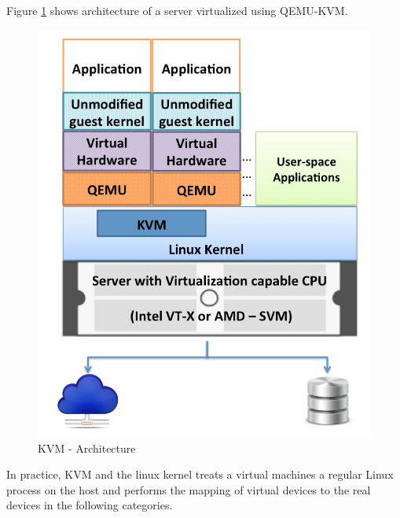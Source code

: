 Figure \ref{img_kvm_arch} shows architecture of a server virtualized using QEMU-KVM.

\newpage 
\begin{figure}[htbp]
\centering
\includegraphics[width=130mm]{kvm-arch.png}
\caption{KVM - Architecture}
\label{img_kvm_arch}
\end{figure}

In practice, KVM and the linux kernel treats a virtual machines a regular Linux process on the host and performs the mapping of virtual devices to the real devices in the following categories.

